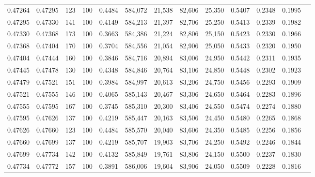\begin{tabular}{rrrrrrrrrrrrr}
0.47264 & 0.47295 &    123 & 100 &                                     0.4484 & 584,072 &  21,538 &  82,606 &  25,350 & 0.5407 & 0.2348 & 0.1995 \\
0.47295 & 0.47330 &    141 & 100 &                                     0.4149 & 584,213 &  21,397 &  82,706 &  25,250 & 0.5413 & 0.2339 & 0.1982 \\
0.47330 & 0.47368 &    173 & 100 &                                     0.3663 & 584,386 &  21,224 &  82,806 &  25,150 & 0.5423 & 0.2330 & 0.1966 \\
0.47368 & 0.47404 &    170 & 100 &                                     0.3704 & 584,556 &  21,054 &  82,906 &  25,050 & 0.5433 & 0.2320 & 0.1950 \\
0.47404 & 0.47444 &    160 & 100 &                                     0.3846 & 584,716 &  20,894 &  83,006 &  24,950 & 0.5442 & 0.2311 & 0.1935 \\
0.47445 & 0.47478 &    130 & 100 &                                     0.4348 & 584,846 &  20,764 &  83,106 &  24,850 & 0.5448 & 0.2302 & 0.1923 \\
0.47479 & 0.47521 &    151 & 100 &                                     0.3984 & 584,997 &  20,613 &  83,206 &  24,750 & 0.5456 & 0.2293 & 0.1909 \\
0.47521 & 0.47555 &    146 & 100 &                                     0.4065 & 585,143 &  20,467 &  83,306 &  24,650 & 0.5464 & 0.2283 & 0.1896 \\
0.47555 & 0.47595 &    167 & 100 &                                     0.3745 & 585,310 &  20,300 &  83,406 &  24,550 & 0.5474 & 0.2274 & 0.1880 \\
0.47595 & 0.47626 &    137 & 100 &                                     0.4219 & 585,447 &  20,163 &  83,506 &  24,450 & 0.5480 & 0.2265 & 0.1868 \\
0.47626 & 0.47660 &    123 & 100 &                                     0.4484 & 585,570 &  20,040 &  83,606 &  24,350 & 0.5485 & 0.2256 & 0.1856 \\
0.47660 & 0.47699 &    137 & 100 &                                     0.4219 & 585,707 &  19,903 &  83,706 &  24,250 & 0.5492 & 0.2246 & 0.1844 \\
0.47699 & 0.47734 &    142 & 100 &                                     0.4132 & 585,849 &  19,761 &  83,806 &  24,150 & 0.5500 & 0.2237 & 0.1830 \\
0.47734 & 0.47772 &    157 & 100 &                                     0.3891 & 586,006 &  19,604 &  83,906 &  24,050 & 0.5509 & 0.2228 & 0.1816 \\

\end{tabular}
